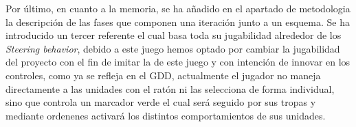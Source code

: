 Por último, en cuanto a la memoria, se ha añadido en el apartado de metodologia la
descripción de las fases que componen una iteración junto a un esquema. Se ha introducido
un tercer referente el cual basa toda su jugabilidad alrededor de los \textit{Steering
behavior}, debido a este juego hemos optado por cambiar la jugabilidad del proyecto
con el fin de imitar la de este juego y con intención de innovar en los controles, como ya se
refleja en el \ac{GDD}, actualmente el jugador no maneja directamente a las unidades con el
ratón ni las selecciona de forma individual, sino que controla un marcador verde el cual será
seguido por sus tropas y mediante ordenenes activará los distintos comportamientos de sus 
unidades. 



